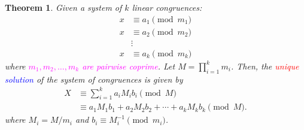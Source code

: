 \documentclass{article}
\newcommand{\inv}[1]{#1^{-1}}
\newtheorem*{theorem*}{Theorem}
\theoremstyle{definition}
\begin{document}
\begin{tcolorbox}[colback=white,colframe=thmcolor,arc=5pt,title={\color{white}\bf Chinese Remainder Theorem ($\mathsf{CRT}$)}]
	\begin{theorem*}
		Given a system of $k$ linear congruences:
		\begin{align*}
			x&\equiv a_1 \pmod{m_1}\\
			x&\equiv a_2 \pmod{m_2}\\
			&\vdots \\
			x&\equiv a_k \pmod{m_k}
		\end{align*} where \textcolor{magenta}{$m_1,m_2,\dots, m_k$ are pairwise coprime}. Let $M=\prod_{i=1}^km_i$. Then, the \textcolor{red}{unique} \textcolor{blue}{solution} of the system of congruences is given by \begin{align*}
			X&\equiv\sum_{i=1}^ka_iM_ib_i\pmod{M}\\
			&\equiv a_1M_1b_1+a_2M_2b_2+\cdots+a_kM_kb_k\pmod{M}.
		\end{align*} where $M_i=M/m_i$ and $ b_i\equiv\inv{M_i}\pmod{m_i}$.
	\end{theorem*}
\end{tcolorbox}
\end{document}
